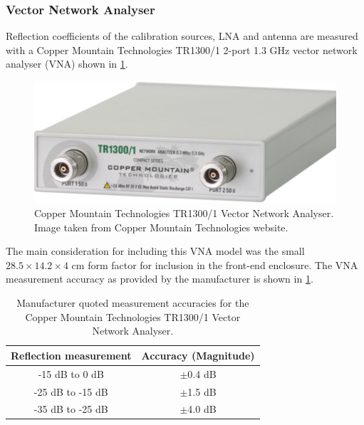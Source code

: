 \subsubsection{Vector Network Analyser}
Reflection coefficients of the calibration sources, LNA and antenna are measured with a Copper Mountain Technologies TR1300/1 2-port 1.3 GHz vector network analyser (VNA) shown in \cref{fig:vna}.
\begin{figure}
    \centering
    \includegraphics[scale=0.5]{vna}
    \caption{Copper Mountain Technologies TR1300/1 Vector Network Analyser. Image taken from Copper Mountain Technologies website.}
    \label{fig:vna}
\end{figure}
The main consideration for including this VNA model was the small $28.5 \times 14.2 \times 4$ cm form factor for inclusion in the front-end enclosure. The VNA measurement accuracy as provided by the manufacturer is shown in \cref{tab:vna_acc}.
\begin{table}
    \begin{center}
    \begin{tabular}{ |c|c| }
    \hline
    Reflection measurement & Accuracy (Magnitude) \\
    \hline
    -15 dB to 0 dB & $\pm$0.4 dB \\
    -25 dB to -15 dB & $\pm$1.5 dB \\
    -35 dB to -25 dB & $\pm$4.0 dB \\
    \hline
    \end{tabular}
    \caption{Manufacturer quoted measurement accuracies for the Copper Mountain Technologies TR1300/1 Vector Network Analyser.}
    \label{tab:vna_acc}
    \end{center}
\end{table}


